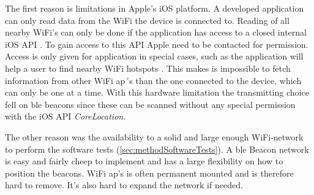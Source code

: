 \bigskip

The first reason is limitations in Apple's iOS platform.
A developed application can only read data from the WiFi the device is connected to.
Reading of all nearby WiFi's can only be done if the application has access to a closed internal iOS API \cite{NEHotspotHelperAppleDeveloper}.
To gain access to this API Apple need to be contacted for permission.
Access is only given for application in special cases, such as the application will help a user to find nearby WiFi hotspots \cite{TechnicalQA1942IOS}.
This makes is impossible to fetch information from other WiFi \acrshort{ap}´s than the one connected to the device, which can only be one at a time.
With this hardware limitation the transmitting choice fell on \acrshort{ble} beacons since these can be scanned without any special permission with the iOS API \textit{CoreLocation}.

\bigskip

The other reason was the availability to a solid and large enough WiFi-network to perform the software tests (\cref{sec:methodSoftwareTests}).
A \acrshort{ble} Beacon network is easy and fairly cheep to implement and has a large flexibility on how to position the beacons.
WiFi \acrshort{ap}'s is often permanent mounted and is therefore hard to remove.
It's also hard to expand the network if needed.
